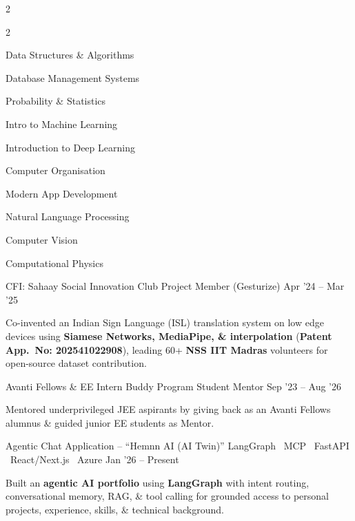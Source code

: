 \documentclass{resume}
\begin{document}
\begin{paracol}{2}
\setlength{\multicolsep}{0pt}
\begin{multicols}{2}
\begin{resumeItemize}
\item Data Structures \& Algorithms
\item Database Management Systems
\item Probability \& Statistics
\item Intro to Machine Learning
\item Introduction to Deep Learning
\item Computer Organisation
\item Modern App Development
\item Natural Language Processing
\item Computer Vision
\item Computational Physics
\end{resumeItemize}
\end{multicols}


\resumeExperience
{CFI: Sahaay Social Innovation Club}
{\textcolor{subheadingblue}{Project Member (Gesturize)}}
{Apr '24 -- Mar '25}
{
\begin{resumeItemize}
\item Co-invented an Indian Sign Language (ISL) translation system on low edge devices using \textbf{Siamese Networks, MediaPipe, \& interpolation} (\textbf{Patent App.~No: 202541022908}), leading 60+ \textbf{NSS IIT Madras} volunteers for open-source dataset contribution.
\end{resumeItemize}
}


\resumeExperience
{Avanti Fellows \& EE Intern Buddy Program}
{\textcolor{subheadingblue}{Student Mentor}}
{Sep '23 -- Aug '26}
{
\begin{resumeItemize}
\item Mentored underprivileged JEE aspirants by giving back as an Avanti Fellows alumnus \& guided junior EE students as Mentor.
\end{resumeItemize}
}


\switchcolumn



\resumeProject
{Agentic Chat Application -- ``Hemnn AI (AI Twin)'' \href{https://frontend-virid-eight-30.vercel.app/}{\small\faGlobe}}
{LangGraph \textbar\ MCP \textbar\ FastAPI \textbar\ React/Next.js \textbar\ Azure}
{Jan '26 -- Present}
{
\begin{resumeItemize}
\item Built an \textbf{agentic AI portfolio} using \textbf{LangGraph} with intent routing, conversational memory, RAG, \& tool calling for grounded access to personal projects, experience, skills, \& technical background.


\end{resumeItemize}}
\end{paracol}
\end{document}
